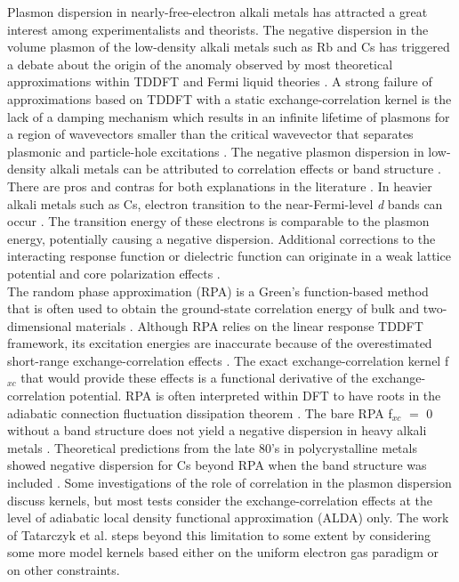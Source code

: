 \documentclass[aps,amsmath,amssymb, preprint, 12pt]{revtex4-1}
\begin{document}
Plasmon dispersion in nearly-free-electron alkali metals has attracted a great interest among experimentalists and theorists. The negative dispersion in the volume plasmon of the low-density alkali metals such as Rb and Cs has triggered a debate about the origin of the anomaly observed by most theoretical approximations within TDDFT and Fermi liquid theories \cite{VSF89}. A strong failure of approximations based on TDDFT with a static exchange-correlation kernel is the lack of a damping mechanism which results in an infinite lifetime of plasmons for a region of wavevectors smaller than the critical wavevector that separates plasmonic and particle-hole excitations \cite{VSF89, PN66}. The negative plasmon dispersion in low-density alkali metals can be attributed to
correlation effects or band structure \cite{AK94, KE99, T92, TS92}. There are pros and contras for both explanations in the literature \cite{T92, TS92}. In heavier alkali metals such as Cs, electron transition to the near-Fermi-level \textit{d} bands can occur \cite{AK94, KE99}. The transition energy of these electrons is comparable to the plasmon energy, potentially causing a negative dispersion. Additional corrections to the interacting response function or dielectric function can originate in a weak lattice potential and core polarization effects \cite{VSF89}.\\ 

The random phase approximation (RPA) is a Green’s function-based method that is often used to obtain the ground-state correlation energy of bulk and two-dimensional materials \cite{BP53, NRB18, NABR19, SGK13, HSK10}. Although RPA relies on the linear response TDDFT framework, its excitation energies are inaccurate because of the overestimated short-range exchange-correlation effects \cite{LP75}. The exact exchange-correlation kernel f$_{xc}$ that would provide these effects is a functional derivative of the exchange-correlation potential. RPA is often interpreted within DFT to have roots in the adiabatic connection fluctuation dissipation theorem \cite{LP77}. The bare RPA f$_{xc}$ $=$ 0 without a band structure does not yield a negative dispersion in heavy alkali metals \cite{AK94}. Theoretical predictions from the late 80's in polycrystalline metals showed negative dispersion for Cs beyond RPA when the band structure was included \cite{VSF89}. Some investigations of the role of correlation in the plasmon dispersion discuss kernels, but most tests consider the exchange-correlation effects at the level of adiabatic local density functional approximation (ALDA) only. The work of Tatarczyk et al. \cite{TSS01} steps beyond this limitation to some extent by considering some more model kernels based either on the uniform electron gas paradigm or on other constraints.\\
\end{document}
